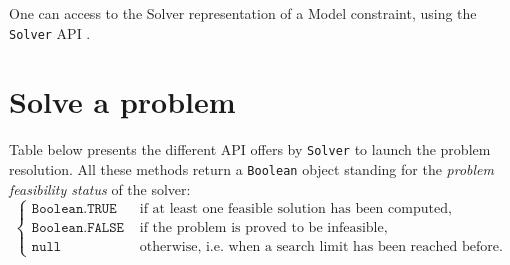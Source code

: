 One can access to the Solver representation of a Model constraint, using the \texttt{Solver} API .

\section{Solve a problem}\label{solver:solveaproblem}\hypertarget{solver:solveaproblem}{}

Table below presents the different API offers by \texttt{Solver} to launch the problem resolution. All these methods return a \texttt{Boolean} object standing for the \emph{problem feasibility status} of the solver:
$$\begin{cases}
  \texttt{Boolean.TRUE} &\text{ if at least one feasible solution has been computed},\\
  \texttt{Boolean.FALSE} &\text{ if the problem is proved to be infeasible},\\
  \texttt{null} &\text{ otherwise, i.e. when a search limit has been reached before.}
\end{cases}$$

